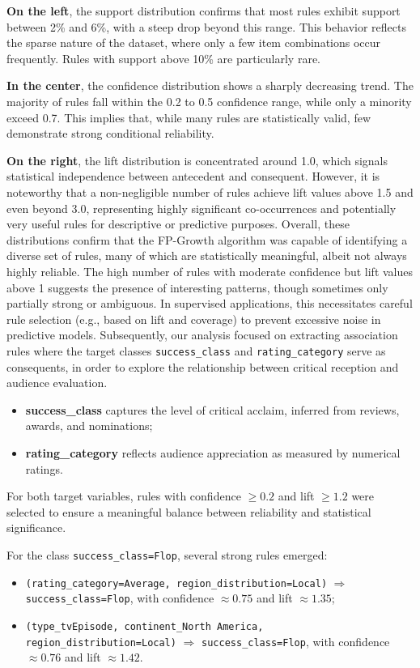 \documentclass[10pt]{article}
\begin{document}
\textbf{On the left}, the support distribution confirms that most rules exhibit support between 2\% and 6\%, with a steep drop beyond this range. This behavior reflects the sparse nature of the dataset, where only a few item combinations occur frequently. Rules with support above 10\% are particularly rare.

\textbf{In the center}, the confidence distribution shows a sharply decreasing trend. The majority of rules fall within the 0.2 to 0.5 confidence range, while only a minority exceed 0.7. This implies that, while many rules are statistically valid, few demonstrate strong conditional reliability.

\textbf{On the right}, the lift distribution is concentrated around 1.0, which signals statistical independence between antecedent and consequent. However, it is noteworthy that a non-negligible number of rules achieve lift values above 1.5 and even beyond 3.0, representing highly significant co-occurrences and potentially very useful rules for descriptive or predictive purposes.
Overall, these distributions confirm that the FP-Growth algorithm was capable of identifying a diverse set of rules, many of which are statistically meaningful, albeit not always highly reliable. The high number of rules with moderate confidence but lift values above 1 suggests the presence of interesting patterns, though sometimes only partially strong or ambiguous. In supervised applications, this necessitates careful rule selection (e.g., based on lift and coverage) to prevent excessive noise in predictive models.
Subsequently, our analysis focused on extracting association rules where the target classes \texttt{success\_class} and \texttt{rating\_category} serve as consequents, in order to explore the relationship between critical reception and audience evaluation.

\begin{itemize}
    \item \textbf{success\_class} captures the level of critical acclaim, inferred from reviews, awards, and nominations;
    \item \textbf{rating\_category} reflects audience appreciation as measured by numerical ratings.
\end{itemize}

For both target variables, rules with confidence $\geq 0.2$ and lift $\geq 1.2$ were selected to ensure a meaningful balance between reliability and statistical significance.

For the class \texttt{success\_class=Flop}, several strong rules emerged:
\begin{itemize}
    \item \texttt{(rating\_category=Average, region\_distribution=Local)} $\Rightarrow$ \texttt{success\_class=Flop}, with confidence $\approx 0.75$ and lift $\approx 1.35$;
    \item \texttt{(type\_tvEpisode, continent\_North America, region\_distribution=Local)} $\Rightarrow$ \texttt{success\_class=Flop}, with confidence $\approx 0.76$ and lift $\approx 1.42$.
\end{itemize}
\end{document}
